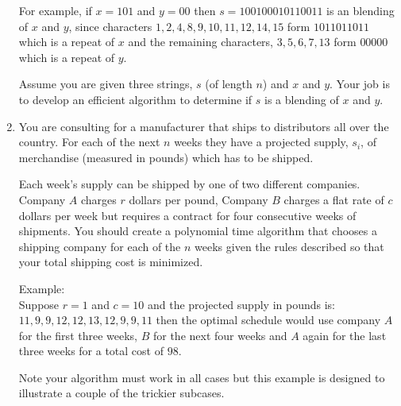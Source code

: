 \documentclass[11pt]{article}
\begin{document}
\begin{enumerate}[1.]
For example, if $x = 101$ and $y = 00$ then $s= 100100010110011$ is an blending of $x$ and $y$, since characters $1,2,4,8,9,10,11,12,14,15$ form $1011011011$ which is a repeat of $x$ and the remaining characters, $3,5,6,7,13$ form $00000$ which is a repeat of $y$.  

Assume you are given three strings, $s$ (of length $n$) and $x$ and $y$.  Your job is to develop an efficient algorithm to determine if $s$ is a blending of $x$ and $y$.  

\item You are consulting for a manufacturer that ships to distributors all over the country.  For each of the next $n$ weeks they have a projected supply, $s_i$, of merchandise (measured in pounds) which has to be shipped.

Each week's supply can be shipped by one of two different companies. Company $A$ charges $r$ dollars per pound, Company $B$ charges a flat rate of $c$ dollars per week but requires a contract for four consecutive weeks of shipments.  You should create a polynomial time algorithm that chooses a shipping company for each of the $n$ weeks given the rules described so that your total shipping cost is minimized.

Example: \\
Suppose $r=1$ and $c=10$ and the projected supply in pounds is: $11,9,9,12,12,13,12,9,9,11$ then the optimal schedule would use company $A$ for the first three weeks, $B$ for the next four weeks and $A$ again for the last three weeks for a total cost of $98$.  

Note your algorithm must work in all cases but this example is designed to illustrate a couple of the trickier subcases.  




\end{enumerate}
\end{document}
